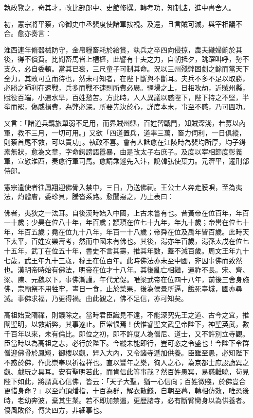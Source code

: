 \begin{pinyinscope}
 執政覽之，奇其才，改比部郎中、史館修撰。轉考功，知制誥，進中書舍人。



 初，憲宗將平蔡，命御史中丞裴度使諸軍按視。及還，且言賊可滅，與宰相議不合。愈亦奏言：



 淮西連年脩器械防守，金帛糧畜耗於給賞，執兵之卒四向侵掠，農夫織婦餉於其後，得不償費。比聞畜馬皆上槽櫪，此譬有十夫之力，自朝抵夕，跳躍叫呼，勢不支久，必自委頓。當其已衰，三尺童子可制其命。況以三州殘弊困劇之餘而當天下全力，其敗可立而待也，然未可知者，在陛下斷與不斷耳。夫兵不多不足以取勝，必勝之師利在速戰，兵多而戰不速則所費必廣。疆場之上，日相攻劫，近賊州縣，賦役百端，小遇水旱，百姓愁苦。方此時，人人異議以惑陛下，陛下持之不堅，半塗而罷，傷威損費，為弊必深。所要先決於心，詳度本末，事至不惑，乃可圖功。



 又言：「諸道兵羈旅單弱不足用，而界賊州縣，百姓習戰鬥，知賊深淺，若募以內軍，教不三月，一切可用。」又欲「四道置兵，道率三萬，畜力伺利，一日俱縱，則蔡首尾不救，可以責功」。執政不喜。會有人詆愈在江陵時為裴均所厚，均子鍔素無狀，愈為文章，字命鍔謗語囂暴，由是改太子右庶子。及度以宰相節度彰義軍，宣慰淮西，奏愈行軍司馬。愈請乘遽先入汴，說韓弘使葉力。元濟平，遷刑部侍郎。



 憲宗遣使者往鳳翔迎佛骨入禁中，三日，乃送佛祠。王公士人奔走膜唄，至為夷法，灼體膚，委珍貝，騰沓系路。愈聞惡之，乃上表曰：



 佛者，夷狄之一法耳。自後漢時始入中國，上古未嘗有也。昔黃帝在位百年，年百一十歲；少昊在位八十年，年百歲；顓頊在位七十九年，年九十歲；帝嚳在位七十年，年百五歲；堯在位九十八年，年百一十八歲；帝舜在位及禹年皆百歲。此時天下太平，百姓安樂壽考，然而中國未有佛也。其後，湯亦年百歲，湯孫太戊在位七十五年，武丁在位五十年，書史不言其壽，推其年數，蓋不減百歲。周文王年九十七歲，武王年九十三歲，穆王在位百年。此時佛法亦未至中國，非因事佛而致然也。漢明帝時始有佛法，明帝在位才十八年。其後亂亡相繼，運祚不長。宋、齊、梁、陳、元魏以下，事佛漸謹，年代尤促。唯梁武帝在位四十八年，前後三舍身施佛，宗廟祭不用牲牢，晝日一食，止於菜果，後為侯景所逼，餓死臺城，國亦尋滅。事佛求福，乃更得禍。由此觀之，佛不足信，亦可知矣。



 高祖始受隋禪，則議除之。當時君臣識見不遠，不能深究先王之道、古今之宜，推闡聖明，以救斯弊，其事遂止。臣常恨焉！伏惟睿聖文武皇帝陛下，神聖英武，數千百年以來，未有倫比。即位之初，即不許度人為僧尼、道士，又不許別立寺觀。臣當時以為高祖之志，必行於陛下。今縱未能即行，豈可恣之令盛也！今陛下令群僧迎佛骨於鳳翔，御樓以觀，舁入大內，又令諸寺遞加供養。臣雖至愚，必知陛下不惑於佛，作此崇奉以祈福祥也。直以豐年之樂，徇人之心，為京都士庶設詭異之觀、戲玩之具耳。安有聖明若此，而肯信此等事哉？然百姓愚冥，易惑難曉，茍見陛下如此，將謂真心信佛，皆云：「天子大聖，猶一心信向；百姓微賤，於佛豈合更惜身命？」以至灼頂燔指，十百為群，解衣散錢，自朝至暮，轉相仿效，唯恐後時，老幼奔波，棄其生業。若不即加禁遏，更歷諸寺，必有斷臂臠身以為供養者。傷風敗俗，傳笑四方，非細事也。




\end{pinyinscope}

